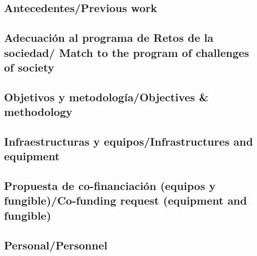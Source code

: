 \documentclass[a4paper,11pt,oneside]{article}
\begin{document}
\subsection*{Antecedentes/Previous work}



\subsection*{\sc Adecuación al programa de Retos de la sociedad/ Match to the program of challenges of society  }



\subsection*{\sc Objetivos y metodología/Objectives \& methodology}








%

\subsection*{\sc Infraestructuras y equipos/Infrastructures and equipment}


%
\subsection*{\sc Propuesta de co-financiación (equipos y fungible)/Co-funding request (equipment and fungible) }


\subsection*{\sc Personal/Personnel}

\end{document}
